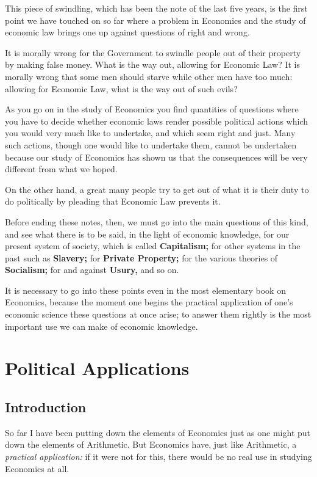 \documentclass{book}
\begin{document}
This piece of swindling, which has been the note of the last five years, is the first point we have touched on so far where a problem in Economics and the study of economic law brings one up against questions of right and wrong.

It is morally wrong for the Government to swindle people out of their property by making false money. What is the way out, allowing for Economic Law? It is morally wrong that some men should starve while other men have too much: allowing for Economic Law, what is the way out of such evils?

As you go on in the study of Economics you find quantities of questions where you have to decide whether economic laws render possible political actions which you would very much like to undertake, and which seem right and just. Many such actions, though one would like to undertake them, cannot be undertaken because our study of Economics has shown us that the consequences will be very different from what we hoped.

On the other hand, a great many people try to get out of what it is their duty to do politically by pleading that Economic Law prevents it.

Before ending these notes, then, we must go into the main questions of this kind, and see what there is to be said, in the light of economic knowledge, for our present system of society, which is called \textbf{Capitalism;} for other systems in the past such as \textbf{Slavery;} for \textbf{Private Property;} for the various theories of \textbf{Socialism;} for and against \textbf{Usury,} and so on.

It is necessary to go into these points even in the most elementary book on Economics, because the moment one begins the practical application of one’s economic science these questions at once arise; to answer them rightly is the most important use we can make of economic knowledge.

\setcounter{chapter}{0}\part{Political Applications}
\label{chapter-8}
\chapter*{Introduction}
\label{chapter-9}
So far I have been putting down the elements of Economics just as one might put down the elements of Arithmetic. But Economics have, just like Arithmetic, a \emph{practical application:} if it were not for this, there would be no real use in studying Economics at all.
\end{document}
